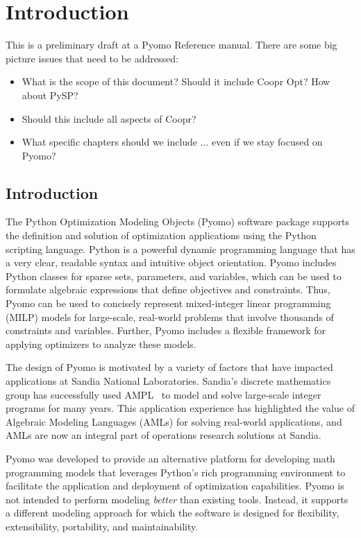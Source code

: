 
\chapter{Introduction}

This is a preliminary draft at a Pyomo Reference manual.  There are some big picture issues that need to be addressed:
\begin{itemize}
\item What is the scope of this document?  Should it include Coopr Opt?  How about PySP?
\item Should this include all aspects of Coopr?
\item What specific chapters should we include ... even if we stay focused on Pyomo?
\end{itemize}

\section{Introduction}

The Python Optimization Modeling Objects (Pyomo) software package
supports the definition and solution of optimization applications using
the Python scripting language.  Python is a powerful dynamic programming
language that has a very clear, readable syntax and intuitive object
orientation.  Pyomo includes Python classes for sparse sets, parameters,
and variables, which can be used to formulate algebraic expressions that
define objectives and constraints.  Thus, Pyomo can be used to concisely
represent mixed-integer linear programming (MILP) models for large-scale,
real-world problems that involve thousands of constraints and variables.
Further, Pyomo includes a flexible framework for applying optimizers to
analyze these models.

The design of Pyomo is motivated by a variety of factors that have
impacted applications at Sandia National Laboratories.  Sandia's discrete
mathematics group has successfully used AMPL~\citep{AMPL,FouGay03}
to model and solve large-scale integer programs for many years.
This application experience has highlighted the value of Algebraic
Modeling Languages (AMLs) for solving real-world applications, and AMLs
are now an integral part of operations research solutions at Sandia.

Pyomo was developed to provide an alternative platform for developing math
programming models that leverages Python's rich programming environment to
facilitate the application and deployment of optimization capabilities.
Pyomo is not intended to perform modeling {\em better} than existing
tools.  Instead, it supports a different modeling approach for which
the software is designed for flexibility, extensibility, portability,
and maintainability.

